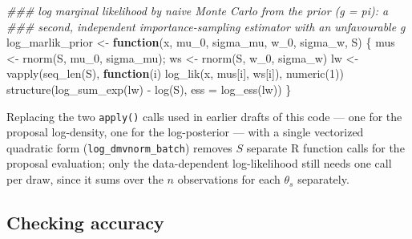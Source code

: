 \documentclass[
  letterpaper,
  DIV=11,
  numbers=noendperiod]{scrreprt}
\newenvironment{Shaded}{\begin{snugshade}}{\end{snugshade}}
\newcommand{\AttributeTok}[1]{\textcolor[rgb]{0.40,0.45,0.13}{#1}}
\newcommand{\ControlFlowTok}[1]{\textcolor[rgb]{0.00,0.23,0.31}{\textbf{#1}}}
\newcommand{\DecValTok}[1]{\textcolor[rgb]{0.68,0.00,0.00}{#1}}
\newcommand{\DocumentationTok}[1]{\textcolor[rgb]{0.37,0.37,0.37}{\textit{#1}}}
\newcommand{\FunctionTok}[1]{\textcolor[rgb]{0.28,0.35,0.67}{#1}}
\newcommand{\NormalTok}[1]{\textcolor[rgb]{0.00,0.23,0.31}{#1}}
\newcommand{\OtherTok}[1]{\textcolor[rgb]{0.00,0.23,0.31}{#1}}
\newcommand{\SpecialCharTok}[1]{\textcolor[rgb]{0.37,0.37,0.37}{#1}}
\begin{document}
\begin{Shaded}
\begin{Highlighting}[]
\DocumentationTok{\#\#\# log marginal likelihood by naive Monte Carlo from the prior (g = pi): a}
\DocumentationTok{\#\#\# second, independent importance{-}sampling estimator with an unfavourable g}
\NormalTok{log\_marlik\_prior }\OtherTok{\textless{}{-}} \ControlFlowTok{function}\NormalTok{(x, mu\_0, sigma\_mu, w\_0, sigma\_w, S) \{}
\NormalTok{    mus }\OtherTok{\textless{}{-}} \FunctionTok{rnorm}\NormalTok{(S, mu\_0, sigma\_mu); ws }\OtherTok{\textless{}{-}} \FunctionTok{rnorm}\NormalTok{(S, w\_0, sigma\_w)}
\NormalTok{    lw }\OtherTok{\textless{}{-}} \FunctionTok{vapply}\NormalTok{(}\FunctionTok{seq\_len}\NormalTok{(S), }\ControlFlowTok{function}\NormalTok{(i) }\FunctionTok{log\_lik}\NormalTok{(x, mus[i], ws[i]), }\FunctionTok{numeric}\NormalTok{(}\DecValTok{1}\NormalTok{))}
    \FunctionTok{structure}\NormalTok{(}\FunctionTok{log\_sum\_exp}\NormalTok{(lw) }\SpecialCharTok{{-}} \FunctionTok{log}\NormalTok{(S), }\AttributeTok{ess =} \FunctionTok{log\_ess}\NormalTok{(lw))}
\NormalTok{\}}
\end{Highlighting}
\end{Shaded}

Replacing the two \texttt{apply()} calls used in earlier drafts of this
code --- one for the proposal log-density, one for the log-posterior ---
with a single vectorized quadratic form (\texttt{log\_dmvnorm\_batch})
removes \(S\) separate R function calls for the proposal evaluation;
only the data-dependent log-likelihood still needs one call per draw,
since it sums over the \(n\) observations for each \(\theta_s\)
separately.

\subsection{Checking accuracy}\label{checking-accuracy}
\end{document}
